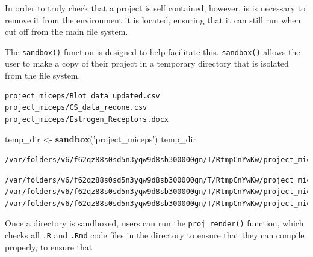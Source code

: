 \documentclass[12pt,twoside]{reedthesis}
\newenvironment{Shaded}{\begin{snugshade}}{\end{snugshade}}
\newcommand{\KeywordTok}[1]{\textcolor[rgb]{0.13,0.29,0.53}{\textbf{#1}}}
\newcommand{\DecValTok}[1]{\textcolor[rgb]{0.00,0.00,0.81}{#1}}
\newcommand{\StringTok}[1]{\textcolor[rgb]{0.31,0.60,0.02}{#1}}
\newcommand{\OperatorTok}[1]{\textcolor[rgb]{0.81,0.36,0.00}{\textbf{#1}}}
\newcommand{\NormalTok}[1]{#1}
\begin{document}
In order to truly check that a project is self contained, however, is is
necessary to remove it from the environment it is located, ensuring that
it can still run when cut off from the main file system.

The \texttt{sandbox()} function is designed to help facilitate this.
\texttt{sandbox()} allows the user to make a copy of their project in a
temporary directory that is isolated from the file system.
\begin{Shaded}
\end{Shaded}
\begin{verbatim}
project_miceps/Blot_data_updated.csv   project_miceps/CS_data_redone.csv      
project_miceps/Estrogen_Receptors.docx 
\end{verbatim}
\begin{Shaded}
\begin{Highlighting}[]
\NormalTok{temp_dir <-}\StringTok{ }\KeywordTok{sandbox}\NormalTok{(}\StringTok{'project_miceps'}\NormalTok{)}
\NormalTok{temp_dir}
\end{Highlighting}
\end{Shaded}
\begin{verbatim}
/var/folders/v6/f62qz88s0sd5n3yqw9d8sb300000gn/T/RtmpCnYwKw/project_miceps
\end{verbatim}
\begin{Shaded}
\end{Shaded}
\begin{verbatim}
/var/folders/v6/f62qz88s0sd5n3yqw9d8sb300000gn/T/RtmpCnYwKw/project_miceps/Blot_data_updated.csv
/var/folders/v6/f62qz88s0sd5n3yqw9d8sb300000gn/T/RtmpCnYwKw/project_miceps/CS_data_redone.csv
/var/folders/v6/f62qz88s0sd5n3yqw9d8sb300000gn/T/RtmpCnYwKw/project_miceps/Estrogen_Receptors.docx
\end{verbatim}
Once a directory is sandboxed, users can run the \texttt{proj\_render()}
function, which checks all \texttt{.R} and \texttt{.Rmd} code files in
the directory to ensure that they can compile properly, to ensure that
\end{document}
